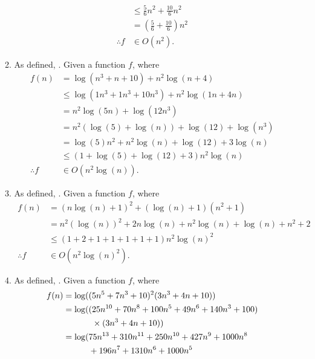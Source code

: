 \documentclass[12pt, a4paper]{article}
\newcommand*\myphantomrel[1]{\mathrel{\phantom{#1}}}
\begin{document}
\begin{enumerate}
\begin{enumerate}
\begin{align*}
					         & \leq \frac{5}{6}n^2 + \frac{10}{6}n^2 \\
					         & = \left( \frac{5}{6} + \frac{10}{6} \right) n^2 \\
				\therefore f & \in O(n^2).
			\end{align*} \label{1(c)}
			\item As defined, . Given a function $f$, where
			\begin{align*}
				f(n)         & = \log(n^3 + n + 10) + n^2\log(n + 4) \\
					         & \leq \log(1n^3 + 1n^3 + 10n^3) + n^2\log(1n + 4n) \\
					         & = n^2\log(5n) + \log(12n^3) \\
					         & = n^2(\log(5) + \log(n)) + \log(12) + \log(n^3) \\
					         & = \log(5)n^2 + n^2\log(n) + \log(12) + 3\log(n) \\
					         & \leq (1 + \log(5) + \log(12) + 3) n^2\log(n) \\
				\therefore f & \in O(n^2\log(n)).
			\end{align*} \label{1(d)}
			\item As defined, . Given a function $f$, where
			\begin{align*}
				f(n)         & = (n\log(n) + 1)^2 + (\log(n) + 1)(n^2 + 1) \\
					         & = n^2(\log(n))^2 + 2n\log(n) + n^2\log(n) + \log(n) + n^2 + 2 \\
					         & \leq (1 + 2 + 1 + 1 + 1 + 1 + 1) n^2\log(n)^2 \\
				\therefore f & \in O(n^2\log(n)^2).
			\end{align*} \label{1(e)}
			\item As defined, . Given a function $f$, where %
			\begin{align*}
				f(n)         & = \log((5n^5 + 7n^3 + 10)^2(3n^3 + 4n + 10)) \\
					         & = \log((25n^{10} + 70n^8 + 100n^5 + 49n^6 + 140n^3 + 100) \\
					         & \myphantomrel{=} \hphantom{\log((} \times (3n^3 + 4n + 10)) \\
					         & = \log(75n^{13} + 310n^{11} + 250n^{10} + 427n^9 + 1000n^8 \\
					         & \myphantomrel{=} \hphantom{\log(} + 196n^7 + 1310n^6 + 1000n^5 \\

\end{align*}
\end{enumerate}
\end{enumerate}
\end{document}
